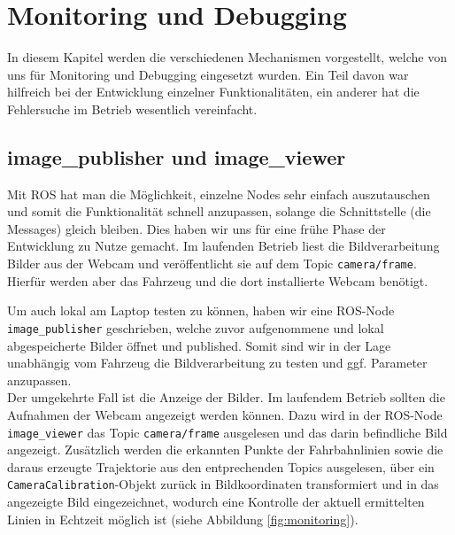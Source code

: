 \section{Monitoring und Debugging}
\label{sec:monitoring}


In diesem Kapitel werden die verschiedenen Mechanismen vorgestellt, welche von uns f\"ur Monitoring und Debugging eingesetzt wurden. Ein Teil davon war hilfreich bei der Entwicklung einzelner Funktionalit\"aten, ein anderer hat die Fehlersuche im Betrieb wesentlich vereinfacht.

\subsection{image\_publisher und image\_viewer}
Mit ROS hat man die M\"oglichkeit, einzelne Nodes sehr einfach auszutauschen und somit die Funktionalit\"at schnell anzupassen, solange die Schnittstelle (die Messages) gleich bleiben. Dies haben wir uns f\"ur eine fr\"uhe Phase der Entwicklung zu Nutze gemacht. Im laufenden Betrieb liest die Bildverarbeitung Bilder aus der Webcam und ver\"offentlicht sie auf dem Topic \texttt{camera/frame}. Hierf\"ur werden aber das Fahrzeug und die dort installierte Webcam ben\"otigt.

Um auch lokal am Laptop testen zu k\"onnen, haben wir eine ROS-Node \texttt{image\_publisher} geschrieben, welche zuvor aufgenommene und lokal abgespeicherte Bilder \"offnet und published. Somit sind wir in der Lage unabh\"angig vom Fahrzeug die Bildverarbeitung zu testen und ggf. Parameter anzupassen.\\

Der umgekehrte Fall ist die Anzeige der Bilder. Im laufendem Betrieb sollten die Aufnahmen der Webcam angezeigt werden k\"onnen. Dazu wird in der ROS-Node \texttt{image\_viewer} das Topic \texttt{camera/frame} ausgelesen und das darin befindliche Bild angezeigt.
Zus\"atzlich werden die erkannten Punkte der Fahrbahnlinien sowie die daraus erzeugte 
Trajektorie aus den entprechenden Topics ausgelesen, \"uber ein 
\texttt{CameraCalibration}-Objekt zur\"uck in Bildkoordinaten transformiert und in
das angezeigte Bild eingezeichnet, wodurch eine Kontrolle der aktuell ermittelten
Linien in Echtzeit m\"oglich ist (siehe Abbildung \ref{fig:monitoring}).

